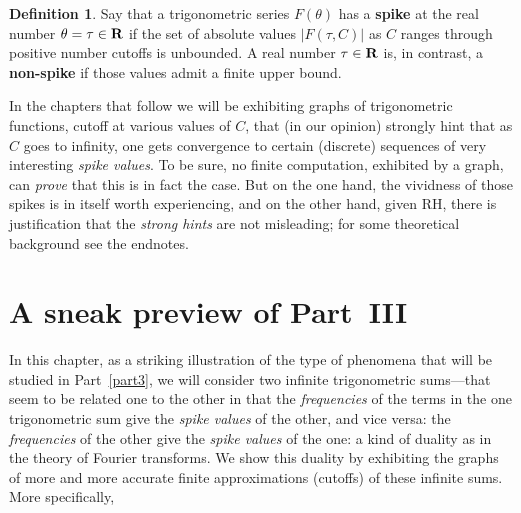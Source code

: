 \documentclass[openany]{book}
\theoremstyle{plain}
\theoremstyle{definition}
\newtheorem{definition}[theorem]{Definition}
\begin{document}
{%

\begin{definition} Say
  that a trigonometric series $F(\theta)$ has a {\bf spike} at the real number $\theta=\tau \in {\bf R}$
if the set of absolute values $|F(\tau,C)|$  as $C$ ranges through positive number cutoffs is
  unbounded.  A real number $\tau \in {\bf R}$ is, in contrast, a {\bf
    non-spike} if those values admit a finite upper
  bound. \end{definition}




 In the chapters that follow we will be exhibiting graphs of trigonometric functions, cutoff at various values of $C$, that (in our opinion) strongly hint that as $C$ goes to infinity, one gets convergence to certain (discrete) sequences of very interesting {\it spike values}. To be sure, no finite computation, exhibited by a graph, can {\it prove} that this is in fact the case. But on the one hand, the vividness of those spikes is in itself worth experiencing, and on the other hand, given RH, there is justification that the {\it strong hints} are not misleading; for some theoretical background see the endnotes.



\chapter{A sneak preview of Part~III}\label{snpr}

   In this chapter, as a striking illustration of the type of phenomena that will be studied in Part~\ref{part3}, we will consider two infinite trigonometric sums---that seem to be related one to the other in that the {\it frequencies} of the terms in the one trigonometric sum give the {\it spike values} of the other, and vice versa:   the {\it frequencies} of the other give the {\it spike values} of the one: a kind of duality as in the theory of Fourier transforms. We show this duality by exhibiting the graphs of more and more accurate finite approximations (cutoffs) of these infinite sums. More specifically,

}
\end{document}
